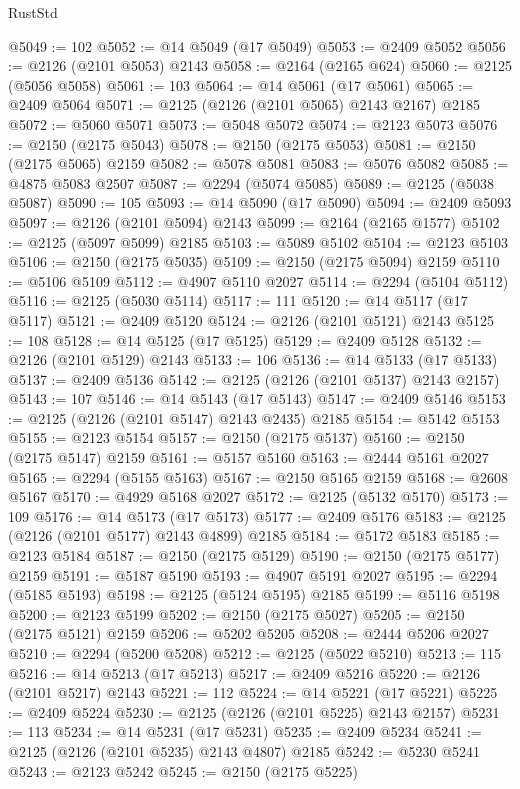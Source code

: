 \begin{lexlean}{RustStd}
\begin{coremodule}
@5049 := 102
@5052 := @14 @5049 (@17 @5049)
@5053 := @2409 @5052
@5056 := @2126 (@2101 @5053) @2143
@5058 := @2164 (@2165 @624)
@5060 := @2125 (@5056 @5058)
@5061 := 103
@5064 := @14 @5061 (@17 @5061)
@5065 := @2409 @5064
@5071 := @2125 (@2126 (@2101 @5065) @2143 @2167) @2185
@5072 := @5060 @5071
@5073 := @5048 @5072
@5074 := @2123 @5073
@5076 := @2150 (@2175 @5043)
@5078 := @2150 (@2175 @5053)
@5081 := @2150 (@2175 @5065) @2159
@5082 := @5078 @5081
@5083 := @5076 @5082
@5085 := @4875 @5083 @2507
@5087 := @2294 (@5074 @5085)
@5089 := @2125 (@5038 @5087)
@5090 := 105
@5093 := @14 @5090 (@17 @5090)
@5094 := @2409 @5093
@5097 := @2126 (@2101 @5094) @2143
@5099 := @2164 (@2165 @1577)
@5102 := @2125 (@5097 @5099) @2185
@5103 := @5089 @5102
@5104 := @2123 @5103
@5106 := @2150 (@2175 @5035)
@5109 := @2150 (@2175 @5094) @2159
@5110 := @5106 @5109
@5112 := @4907 @5110 @2027
@5114 := @2294 (@5104 @5112)
@5116 := @2125 (@5030 @5114)
@5117 := 111
@5120 := @14 @5117 (@17 @5117)
@5121 := @2409 @5120
@5124 := @2126 (@2101 @5121) @2143
@5125 := 108
@5128 := @14 @5125 (@17 @5125)
@5129 := @2409 @5128
@5132 := @2126 (@2101 @5129) @2143
@5133 := 106
@5136 := @14 @5133 (@17 @5133)
@5137 := @2409 @5136
@5142 := @2125 (@2126 (@2101 @5137) @2143 @2157)
@5143 := 107
@5146 := @14 @5143 (@17 @5143)
@5147 := @2409 @5146
@5153 := @2125 (@2126 (@2101 @5147) @2143 @2435) @2185
@5154 := @5142 @5153
@5155 := @2123 @5154
@5157 := @2150 (@2175 @5137)
@5160 := @2150 (@2175 @5147) @2159
@5161 := @5157 @5160
@5163 := @2444 @5161 @2027
@5165 := @2294 (@5155 @5163)
@5167 := @2150 @5165 @2159
@5168 := @2608 @5167
@5170 := @4929 @5168 @2027
@5172 := @2125 (@5132 @5170)
@5173 := 109
@5176 := @14 @5173 (@17 @5173)
@5177 := @2409 @5176
@5183 := @2125 (@2126 (@2101 @5177) @2143 @4899) @2185
@5184 := @5172 @5183
@5185 := @2123 @5184
@5187 := @2150 (@2175 @5129)
@5190 := @2150 (@2175 @5177) @2159
@5191 := @5187 @5190
@5193 := @4907 @5191 @2027
@5195 := @2294 (@5185 @5193)
@5198 := @2125 (@5124 @5195) @2185
@5199 := @5116 @5198
@5200 := @2123 @5199
@5202 := @2150 (@2175 @5027)
@5205 := @2150 (@2175 @5121) @2159
@5206 := @5202 @5205
@5208 := @2444 @5206 @2027
@5210 := @2294 (@5200 @5208)
@5212 := @2125 (@5022 @5210)
@5213 := 115
@5216 := @14 @5213 (@17 @5213)
@5217 := @2409 @5216
@5220 := @2126 (@2101 @5217) @2143
@5221 := 112
@5224 := @14 @5221 (@17 @5221)
@5225 := @2409 @5224
@5230 := @2125 (@2126 (@2101 @5225) @2143 @2157)
@5231 := 113
@5234 := @14 @5231 (@17 @5231)
@5235 := @2409 @5234
@5241 := @2125 (@2126 (@2101 @5235) @2143 @4807) @2185
@5242 := @5230 @5241
@5243 := @2123 @5242
@5245 := @2150 (@2175 @5225)

\end{coremodule}
\end{lexlean}
